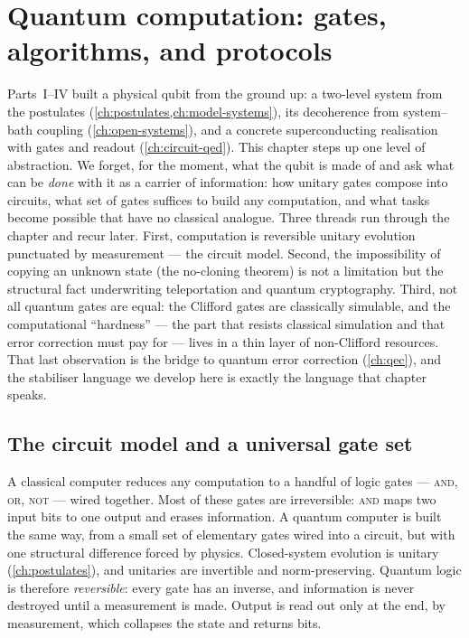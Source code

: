 \chapter{Quantum computation: gates, algorithms, and protocols}
\label{ch:quantum-information-processing}

Parts~I--IV built a physical qubit from the ground up: a two-level
system from the postulates (\cref{ch:postulates,ch:model-systems}), its
decoherence from system--bath coupling (\cref{ch:open-systems}), and a
concrete superconducting realisation with gates and readout
(\cref{ch:circuit-qed}). This chapter steps up one level of
abstraction. We forget, for the moment, what the qubit is made of and
ask what can be \emph{done} with it as a carrier of information:
how unitary gates compose into circuits, what set of gates suffices to
build any computation, and what tasks become possible that have no
classical analogue. Three threads run through the chapter and recur
later. First, computation is reversible unitary evolution punctuated by
measurement --- the circuit model. Second, the impossibility of copying
an unknown state (the no-cloning theorem) is not a limitation but the
structural fact underwriting teleportation and quantum cryptography.
Third, not all quantum gates are equal: the Clifford gates are
classically simulable, and the computational ``hardness'' --- the part
that resists classical simulation and that error correction must pay
for --- lives in a thin layer of non-Clifford resources. That last
observation is the bridge to quantum error correction
(\cref{ch:qec}), and the stabiliser language we develop here is exactly
the language that chapter speaks.

\section{The circuit model and a universal gate set}
\label{sec:circuit-model}

\begin{phenomenon}
A classical computer reduces any computation to a handful of logic
gates --- \textsc{and}, \textsc{or}, \textsc{not} --- wired together.
Most of these gates are irreversible: \textsc{and} maps two input bits
to one output and erases information. A quantum computer is built the
same way, from a small set of elementary gates wired into a circuit,
but with one structural difference forced by physics. Closed-system
evolution is unitary (\cref{ch:postulates}), and unitaries are
invertible and norm-preserving. Quantum logic is therefore
\emph{reversible}: every gate has an inverse, and information is never
destroyed until a measurement is made. Output is read out only at the
end, by measurement, which collapses the state and returns bits.
\end{phenomenon}

